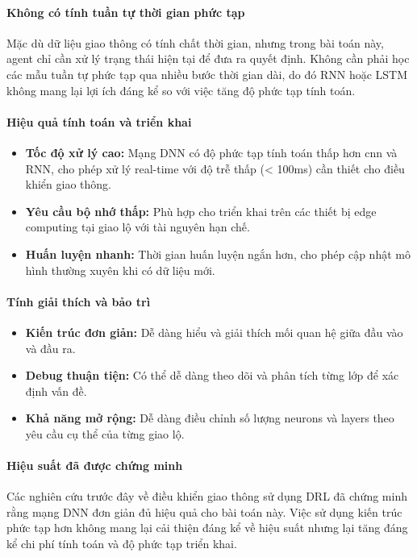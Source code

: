 \paragraph{Không có tính tuần tự thời gian phức tạp}
Mặc dù dữ liệu giao thông có tính chất thời gian, nhưng trong bài toán này, agent chỉ cần xử lý trạng thái hiện tại để đưa ra quyết định. Không cần phải học các mẫu tuần tự phức tạp qua nhiều bước thời gian dài, do đó RNN hoặc LSTM không mang lại lợi ích đáng kể so với việc tăng độ phức tạp tính toán.

\paragraph{Hiệu quả tính toán và triển khai}
\begin{itemize}
    \item \textbf{Tốc độ xử lý cao:} Mạng DNN có độ phức tạp tính toán thấp hơn \ac{cnn} và RNN, cho phép xử lý real-time với độ trễ thấp (< 100ms) cần thiết cho điều khiển giao thông.
    \item \textbf{Yêu cầu bộ nhớ thấp:} Phù hợp cho triển khai trên các thiết bị edge computing tại giao lộ với tài nguyên hạn chế.
    \item \textbf{Huấn luyện nhanh:} Thời gian huấn luyện ngắn hơn, cho phép cập nhật mô hình thường xuyên khi có dữ liệu mới.
\end{itemize}

\paragraph{Tính giải thích và bảo trì}
\begin{itemize}
    \item \textbf{Kiến trúc đơn giản:} Dễ dàng hiểu và giải thích mối quan hệ giữa đầu vào và đầu ra.
    \item \textbf{Debug thuận tiện:} Có thể dễ dàng theo dõi và phân tích từng lớp để xác định vấn đề.
    \item \textbf{Khả năng mở rộng:} Dễ dàng điều chỉnh số lượng neurons và layers theo yêu cầu cụ thể của từng giao lộ.
\end{itemize}

\paragraph{Hiệu suất đã được chứng minh}
Các nghiên cứu trước đây về điều khiển giao thông sử dụng DRL đã chứng minh rằng mạng DNN đơn giản đủ hiệu quả cho bài toán này. Việc sử dụng kiến trúc phức tạp hơn không mang lại cải thiện đáng kể về hiệu suất nhưng lại tăng đáng kể chi phí tính toán và độ phức tạp triển khai.

